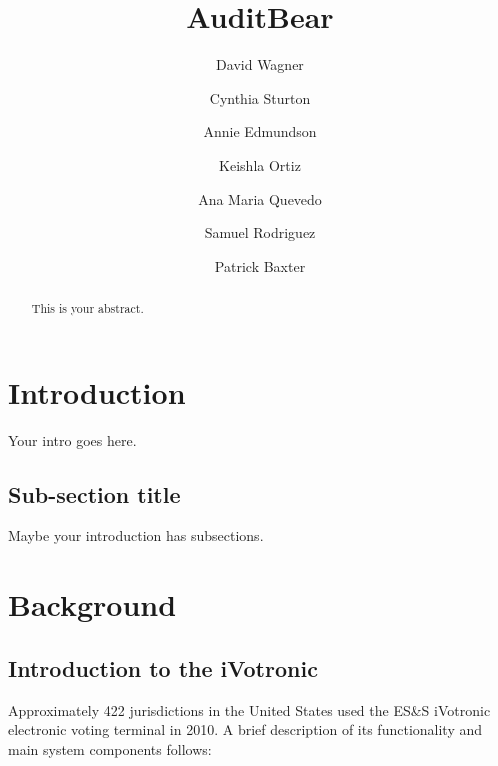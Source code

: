 \documentclass[letterpaper,twocolumn,10pt]{article}
\begin{document}
\title{AuditBear}
\author{David Wagner
\and Cynthia Sturton
\and Annie Edmundson
\and Keishla Ortiz
\and Ana Maria Quevedo
\and Samuel Rodriguez
\and Patrick Baxter}
\maketitle
\begin{abstract}
This is your abstract.
\end{abstract}

\section{Introduction}
Your intro goes here.

\subsection{Sub-section title}
Maybe your introduction has subsections.

\section{Background}

\subsection{Introduction to the iVotronic}
Approximately 422 jurisdictions in the United States used the ES\&S iVotronic electronic voting terminal in 2010.  A brief description of  its functionality and main system components follows:
\end{document}
